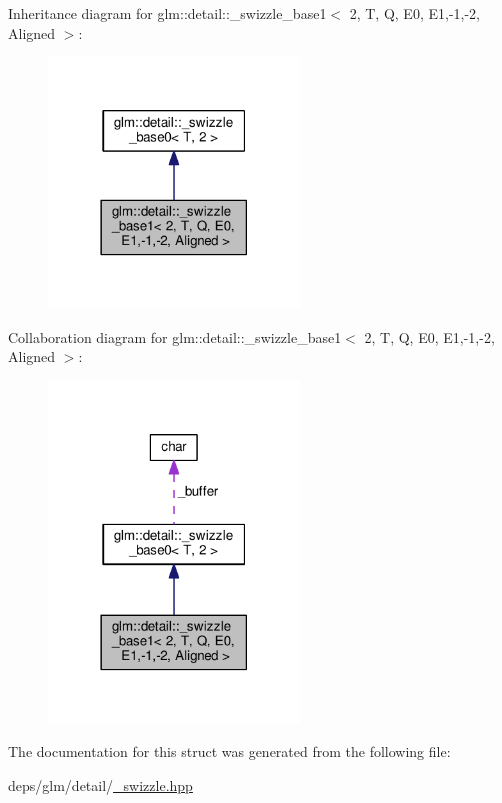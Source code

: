 Inheritance diagram for glm\+:\+:detail\+:\+:\+\_\+swizzle\+\_\+base1$<$ 2, T, Q, E0, E1,-\/1,-\/2, Aligned $>$\+:
\nopagebreak
\begin{figure}[H]
\begin{center}
\leavevmode
\includegraphics[width=189pt]{d2/d09/structglm_1_1detail_1_1__swizzle__base1_3_012_00_01T_00_01Q_00_01E0_00_01E1_00-1_00-2_00_01Aligned_01_4__inherit__graph}
\end{center}
\end{figure}


Collaboration diagram for glm\+:\+:detail\+:\+:\+\_\+swizzle\+\_\+base1$<$ 2, T, Q, E0, E1,-\/1,-\/2, Aligned $>$\+:
\nopagebreak
\begin{figure}[H]
\begin{center}
\leavevmode
\includegraphics[width=189pt]{d2/dda/structglm_1_1detail_1_1__swizzle__base1_3_012_00_01T_00_01Q_00_01E0_00_01E1_00-1_00-2_00_01Aligned_01_4__coll__graph}
\end{center}
\end{figure}


The documentation for this struct was generated from the following file\+:\begin{DoxyCompactItemize}
\item 
deps/glm/detail/\hyperlink{__swizzle_8hpp}{\+\_\+swizzle.\+hpp}\end{DoxyCompactItemize}
